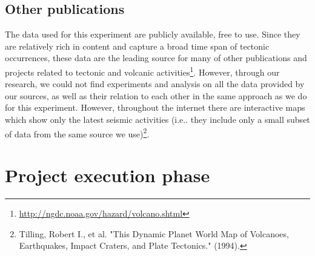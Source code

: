 \documentclass[12pt, a4paper]{article}
\begin{document}
\subsection{Other publications}
The data used for this experiment are publicly available, free to use. Since they are relatively rich in content and capture a broad time span of tectonic occurrences, these data are the leading source for many of other publications and projects related to tectonic and volcanic activities\footnote{\url{http://ngdc.noaa.gov/hazard/volcano.shtml}}. However, through our research, we could not find experiments and analysis on all the data provided by our sources, as well as their relation to each other in the same approach as we do for this experiment. However, throughout the internet there are interactive maps which show only the latest seismic activities (i.e.. they include only a small subset of data from the same source we use)\footnote{Tilling, Robert I., et al. "This Dynamic Planet World Map of Volcanoes, Earthquakes, Impact Craters, and Plate Tectonics." (1994).}.


\section{Project execution phase}
\end{document}
